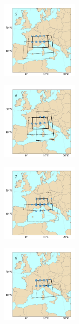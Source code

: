 \documentclass{ametsoc}
\begin{document}
\begin{figure}[htb]
	\begin{subfigure}{.5\columnwidth}
		\centering
		\includegraphics[width=3.9cm]{figures/spatial_win_z4-hi4/Spatial_windows_5.png}
	\end{subfigure}%
	\begin{subfigure}{.5\columnwidth}
		\centering
		\includegraphics[width=3.9cm]{figures/spatial_win_z4-hi4/Spatial_windows_6.png}
	\end{subfigure}
	\begin{subfigure}{.5\columnwidth}
		\centering
		\includegraphics[width=3.9cm]{figures/spatial_win_z4-hi4/Spatial_windows_7.png}
	\end{subfigure}%
	\begin{subfigure}{.5\columnwidth}
		\centering
		\includegraphics[width=3.9cm]{figures/spatial_win_z4-hi4/Spatial_windows_8.png}
	\end{subfigure}
	\begin{subfigure}{.5\columnwidth}

\end{subfigure}
\end{figure}
\end{document}

